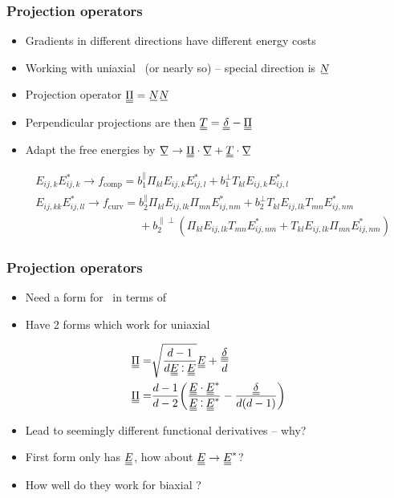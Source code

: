 \documentclass[10pt]{beamer}
\begin{document}
\begin{frame}
\frametitle{Projection operators}
\begin{itemize}
    \item Gradients in different directions have different energy costs
    \item Working with uniaxial \EE\ (or nearly so) -- special direction is $\su{N}$
    \item Projection operator $\du{\Pi}=\su{N}\su{N}$
    \item Perpendicular projections are then $\du{T} = \du{\delta} - \du{\Pi}$
    \item Adapt the free energies by $\su{\nabla} \rightarrow \du{\Pi}\cdot\su{\nabla} + \du{T}\cdot\su{\nabla}$
\end{itemize}
\begin{align*}
    &E_{ij,k}E_{ij,k}^* \rightarrow f_\text{comp} = b_1^\parallel \Pi_{kl} E_{ij,k}E_{ij,l}^* + b_1^\perp T_{kl} E_{ij,k}E_{ij,l}^* \\
    &E_{ij,kk}E_{ij,ll}^* \rightarrow f_\text{curv} = b_2^\parallel \Pi_{kl}E_{ij,lk}\Pi_{mn}E_{ij,nm}^* + b_2^\perp T_{kl}E_{ij,lk}T_{mn}E_{ij,nm}^* \\
    &\phantom{E_{ij,kk}E_{ij,ll}^* \rightarrow f_\text{curv} =}+ b_2^{\parallel\perp}(\Pi_{kl}E_{ij,lk}T_{mn}E_{ij,nm}^* + T_{kl}E_{ij,lk}\Pi_{mn}E_{ij,nm}^*)
\end{align*}
\end{frame}

\begin{frame}
\frametitle{Projection operators}
\begin{itemize}
    \item Need a form for \PP\ in terms of \EE
    \item Have 2 forms which work for uniaxial \EE
\end{itemize}
\begin{align*}
    \du{\Pi} =& \sqrt{\frac{d-1}{d \du{E} \cddot \du{E}}} \du{E} + \frac{\du{\delta}}{d} \\
    \du{\Pi} =& \frac{d-1}{d-2}\qty(\frac{\du{E} \cdot \du{E}^*}{\du{E} \cddot \du{E}^*} - \frac{\du{\delta}}{d(d-1)})
\end{align*}
\begin{itemize}
    \item Lead to seemingly different functional derivatives -- why?
    \item First form only has $\du{E}$, how about $\du{E} \rightarrow \du{E}^*$?
    \item How well do they work for biaxial \EE?
\end{itemize}
\end{frame}
\end{document}
